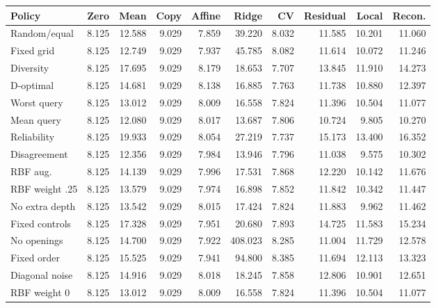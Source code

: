 \begin{tabular}{lrrrrrrrrr}
\toprule
Policy & Zero & Mean & Copy & Affine & Ridge & CV & Residual & Local & Recon. \\
\midrule
Random/equal & 8.125 & 12.588 & 9.029 & 7.859 & 39.220 & 8.032 & 11.585 & 10.201 & 11.060 \\
Fixed grid & 8.125 & 12.749 & 9.029 & 7.937 & 45.785 & 8.082 & 11.614 & 10.072 & 11.246 \\
Diversity & 8.125 & 17.695 & 9.029 & 8.179 & 18.653 & 7.707 & 13.845 & 11.910 & 14.273 \\
D-optimal & 8.125 & 14.681 & 9.029 & 8.138 & 16.885 & 7.763 & 11.738 & 10.880 & 12.397 \\
Worst query & 8.125 & 13.012 & 9.029 & 8.009 & 16.558 & 7.824 & 11.396 & 10.504 & 11.077 \\
Mean query & 8.125 & 12.080 & 9.029 & 8.017 & 13.687 & 7.806 & 10.724 & 9.805 & 10.270 \\
Reliability & 8.125 & 19.933 & 9.029 & 8.054 & 27.219 & 7.737 & 15.173 & 13.400 & 16.352 \\
Disagreement & 8.125 & 12.356 & 9.029 & 7.984 & 13.946 & 7.796 & 11.038 & 9.575 & 10.302 \\
RBF aug. & 8.125 & 14.139 & 9.029 & 7.996 & 17.531 & 7.868 & 12.220 & 10.142 & 11.676 \\
RBF weight .25 & 8.125 & 13.579 & 9.029 & 7.974 & 16.898 & 7.852 & 11.842 & 10.342 & 11.447 \\
No extra depth & 8.125 & 13.542 & 9.029 & 8.015 & 17.424 & 7.824 & 11.883 & 9.962 & 11.462 \\
Fixed controls & 8.125 & 17.328 & 9.029 & 7.951 & 20.680 & 7.893 & 14.725 & 11.583 & 15.234 \\
No openings & 8.125 & 14.700 & 9.029 & 7.922 & 408.023 & 8.285 & 11.004 & 11.729 & 12.578 \\
Fixed order & 8.125 & 15.525 & 9.029 & 7.941 & 94.800 & 8.385 & 11.694 & 12.113 & 13.323 \\
Diagonal noise & 8.125 & 14.916 & 9.029 & 8.018 & 18.245 & 7.858 & 12.806 & 10.901 & 12.651 \\
RBF weight 0 & 8.125 & 13.012 & 9.029 & 8.009 & 16.558 & 7.824 & 11.396 & 10.504 & 11.077 \\
\bottomrule
\end{tabular}
